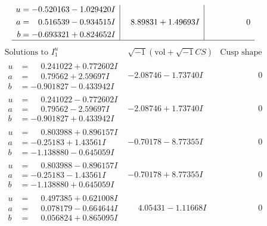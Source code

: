 \documentclass[1p]{elsarticle_modified}
\theoremstyle{definition}
\newcommand{\I}{\sqrt{-1}}
\begin{document}
$$\begin{array}{c|c|c}
\begin{aligned}
u &= -0.520163 - 1.029420 I \\
a &= \phantom{-}0.516539 - 0.934515 I \\
b &= -0.693321 + 0.824652 I\end{aligned}
 & \phantom{-}8.89831 + 1.49693 I & \phantom{-0.000000 } 0\\
 \hline 
 \end{array}$$\newpage$$\begin{array}{c|c|c}  
\text{Solutions to }I^u_{1}& \I (\text{vol} + \sqrt{-1}CS) & \text{Cusp shape}\\
 \hline 
\begin{aligned}
u &= \phantom{-}0.241022 + 0.772602 I \\
a &= \phantom{-}0.79562 + 2.59697 I \\
b &= -0.901827 - 0.433942 I\end{aligned}
 & -2.08746 - 1.73740 I & \phantom{-0.000000 } 0 \\ \hline\begin{aligned}
u &= \phantom{-}0.241022 - 0.772602 I \\
a &= \phantom{-}0.79562 - 2.59697 I \\
b &= -0.901827 + 0.433942 I\end{aligned}
 & -2.08746 + 1.73740 I & \phantom{-0.000000 } 0 \\ \hline\begin{aligned}
u &= \phantom{-}0.803988 + 0.896157 I \\
a &= -0.25183 + 1.43561 I \\
b &= -1.138880 - 0.645059 I\end{aligned}
 & -0.70178 - 8.77355 I & \phantom{-0.000000 } 0 \\ \hline\begin{aligned}
u &= \phantom{-}0.803988 - 0.896157 I \\
a &= -0.25183 - 1.43561 I \\
b &= -1.138880 + 0.645059 I\end{aligned}
 & -0.70178 + 8.77355 I & \phantom{-0.000000 } 0 \\ \hline\begin{aligned}
u &= \phantom{-}0.497385 + 0.621008 I \\
a &= \phantom{-}0.078179 - 0.664644 I \\
b &= \phantom{-}0.056824 + 0.865095 I\end{aligned}
 & \phantom{-}4.05431 - 1.11668 I & \phantom{-0.000000 } 0 \\ \hline\begin{aligned}

\end{aligned}
\end{array}$$
\end{document}
